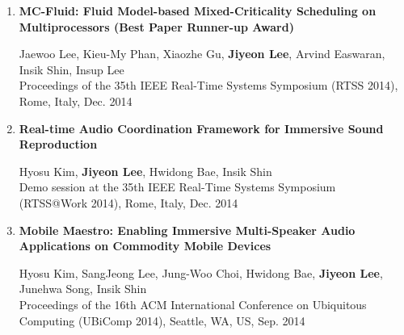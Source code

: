 \documentclass[11pt,letterpaper]{article}
\begin{document}
\begin{enumerate}
	\item \textbf{MC-Fluid: Fluid Model-based Mixed-Criticality Scheduling on Multiprocessors (Best Paper Runner-up Award)} \\
	\begin{small}
		Jaewoo Lee, Kieu-My Phan, Xiaozhe Gu, \textbf{Jiyeon Lee}, Arvind Easwaran, Insik Shin, Insup Lee\\ 
		Proceedings of the 35th IEEE Real-Time Systems Symposium (RTSS 2014), Rome, Italy, Dec. 2014
	\end{small}

	\item \textbf{Real-time Audio Coordination Framework for Immersive Sound Reproduction} \\
	\begin{small}
		Hyosu Kim, \textbf{Jiyeon Lee}, Hwidong Bae, Insik Shin\\ 
		Demo session at the 35th IEEE Real-Time Systems Symposium (RTSS@Work 2014), Rome, Italy, Dec. 2014
	\end{small}

	\item \textbf{Mobile Maestro: Enabling Immersive Multi-Speaker Audio Applications on Commodity Mobile Devices} \\
	\begin{small}
		Hyosu Kim, SangJeong Lee, Jung-Woo Choi, Hwidong Bae, \textbf{Jiyeon Lee}, Junehwa Song, Insik Shin\\ 
		Proceedings of the 16th ACM International Conference on Ubiquitous Computing (UBiComp 2014), Seattle, WA, US, Sep. 2014
	\end{small}

\end{enumerate}
\end{document}
